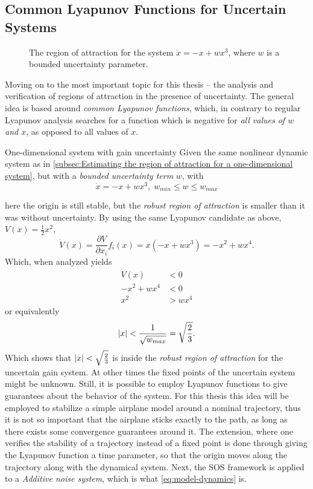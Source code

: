 \subsection{Common Lyapunov Functions for Uncertain Systems}

\begin{figure}
  \centering
  
  \caption[The region of attraction for the system \(\dot{x} = -x + wx^3\)]{The
    region of attraction for the system \(\dot{x} = -x + wx^3\), where \(w\) is
    a bounded uncertainty parameter.}
\end{figure}

Moving on to the most important topic for this thesis -- the analysis and
verification of regions of attraction in the presence of uncertainty. The
general idea is based around \textit{common Lyapunov functions}, which, in
contrary to regular Lyapunov analysis searches for a function which is negative
for \textit{all values of \(w\) and \(x\)}, as opposed to all values of \(x\).
\begin{example}{One-dimensional system with gain uncertainty}
  Given the same nonlinear dynamic system as in \cref{subsec:Estimating the
    region of attraction for a one-dimensional system}, but with a
  \textit{bounded uncertainty term} \(w\), with
  \[
    \dot{x} = -x + wx^3, \; w_{min} \leq w \leq w_{max}
  \]
\end{example}
here the origin is still stable, but the \textit{robust region of attraction} is
smaller than it was without uncertainty. By using the same Lyapunov candidate as
above, \(V(x) = \frac{1}{2}x^2\),
\[
  \dot{V}(x) = \frac{\partial V}{\partial x_i} f_i(x) = x(-x + wx^3) = -x^2 +
  wx^4.
\]
Which, when analyzed yields
\begin{align*}
  \dot{V}(x) &< 0 \\
  -x^2 + wx^4 &< 0 \\
  x^2 &> wx^4
\end{align*}
or equivalently
\[
  \lvert x\rvert < \frac{1}{\sqrt{w_{max}}} = \sqrt{\frac{2}{3}}.
\]
Which shows that \(\lvert x\rvert < \sqrt{\frac{2}{3}}\) is inside the \textit{robust
  region of attraction} for the uncertain gain system. At other times the fixed
points of the uncertain system might be unknown. Still, it is possible to employ
Lyapunov functions to give guarantees about the behavior of the system. For this
thesis this idea will be employed to stabilize a simple airplane model around a
nominal trajectory, thus it is not so important that the airplane sticks exactly
to the path, as long as there exists some convergence guarantees around it. The
extension, where one verifies the stability of a trajectory instead of a fixed
point is done through giving the Lyapunov function a time parameter, so that the
origin moves along the trajectory along with the dynamical system. Next, the
\ac{SOS} framework is applied to a \textit{Additive noise system}, which is what
\cref{eq:model-dynamics} is.

